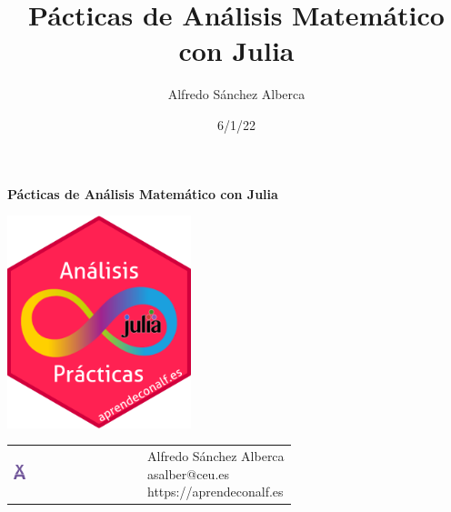 \documentclass[
  a4paper,
]{scrreport}
\title{Pácticas de Análisis Matemático con Julia}
\author{Alfredo Sánchez Alberca}
\date{6/1/22}
\renewcommand*\contentsname{Tabla de contenidos}
\newcommand\contentsname{Tabla de contenidos}
\theoremstyle{definition}
\theoremstyle{remark}
\begin{document}
\begin{titlepage}

\begin{center}
\vspace*{5cm}

\Huge
{\textbf{\textsf{Pácticas de Análisis Matemático con Julia}}}

\vspace{0.5cm}
\LARGE
{\textbf{\textsf{}}}

\vspace{1.5cm}

\includegraphics[width=0.4\textwidth]{img/logos/sticker.png}
\end{center}

\vfill

\begin{flushleft}
\begin{tabular}{ll}
\includegraphics[width=0.1\textwidth]{img/logos/aprendeconalf.png} & \parbox[b]{5cm}{\Large\textsf{Alfredo
Sánchez
Alberca}\\ \textsf{asalber@ceu.es} \\ \textsf{https://aprendeconalf.es}}
\end{tabular}
\end{flushleft}
\end{titlepage}\ifdefined\Shaded\renewenvironment{Shaded}{\begin{tcolorbox}[enhanced, boxrule=0pt, borderline west={3pt}{0pt}{shadecolor}, interior hidden, breakable, sharp corners, frame hidden]}{\end{tcolorbox}}\fi

\renewcommand*\contentsname{Tabla de contenidos}
{
\hypersetup{linkcolor=}
\setcounter{tocdepth}{2}
\tableofcontents
}
\end{document}
